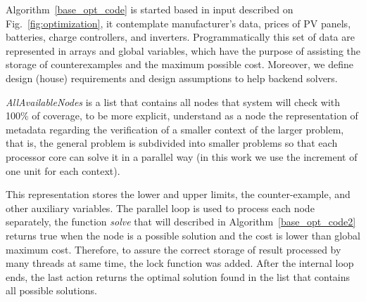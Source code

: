\documentclass[10pt,journal,compsoc]{IEEEtran}
\begin{document}
Algorithm~\ref{base_opt_code} is started based in input described on Fig.~\ref{fig:optimization}, it contemplate manufacturer’s data, prices of PV panels, batteries, charge controllers, and inverters. Programmatically this set of data are represented in arrays and global variables, which have the purpose of assisting the storage of counterexamples and the maximum possible cost. Moreover, we define design (house) requirements and design assumptions to help backend solvers. 

\textit{AllAvailableNodes} is a list that contains all nodes that system will check with 100\% of coverage, to be more explicit, understand as a node the representation of metadata regarding the verification of a smaller context of the larger problem, that is, the general problem is subdivided into smaller problems so that each processor core can solve it in a parallel way (in this work we use the increment of one unit for each context).

This representation stores the lower and upper limits, the counter-example, and other auxiliary variables. The parallel loop is used to process each node separately, the function \textit{solve} that will described in Algorithm~\ref{base_opt_code2} returns true when the node is a possible solution and the cost is lower than global maximum cost. Therefore, to assure the correct storage of result processed by many threads at same time, the lock function was added. After the internal loop ends, the last action returns the optimal solution found in the list that contains all possible solutions.
\end{document}

